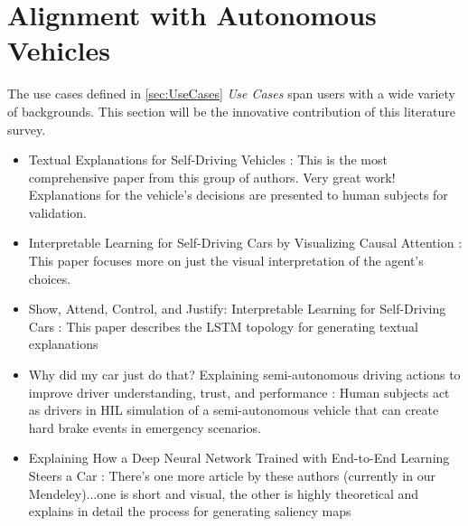 \section{Alignment with Autonomous Vehicles}\label{sec:Alignment}

The use cases defined in \ref{sec:UseCases} \textit{Use Cases} span users with a wide variety of backgrounds.  This section will be the innovative contribution of this literature survey.

\begin{itemize}
    \item Textual Explanations for Self-Driving Vehicles \cite{kim2018textual}: This is the most comprehensive paper from this group of authors.  Very great work!  Explanations for the vehicle's decisions are presented to human subjects for validation.

    \item Interpretable Learning for Self-Driving Cars by Visualizing Causal Attention \cite{Kim2017InterpretableLF}:  This paper focuses more on just the visual interpretation of the agent's choices.

    \item Show, Attend, Control, and Justify: Interpretable Learning for Self-Driving Cars \cite{Kim2017ShowA}: This paper describes the LSTM topology for generating textual explanations

    \item Why did my car just do that? Explaining semi-autonomous driving actions to improve driver understanding, trust, and performance \cite{Koo2015}:  Human subjects act as drivers in HIL simulation of a semi-autonomous vehicle that can create hard brake events in emergency scenarios.
    
    \item Explaining How a Deep Neural Network Trained with End-to-End Learning Steers a Car \cite{Bojarski2017ExplainingHA}: There's one more article by these authors (currently in our Mendeley)...one is short and visual, the other is highly theoretical and explains in detail the process for generating saliency maps
\end{itemize}
